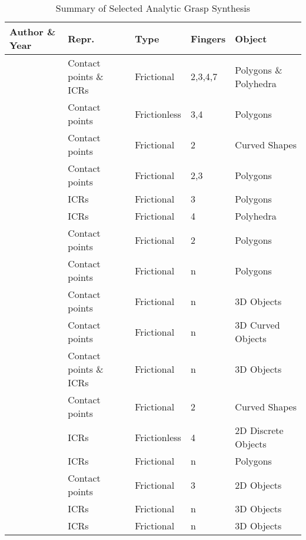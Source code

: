 \documentclass[letterpaper,10pt]{article}
\begin{document}
\begin{table}[t]
\caption{Summary of Selected Analytic Grasp Synthesis}
\label{table:analytic-grasp}
\begin{center}
\begin{tabularx}{1\columnwidth}{m{4cm}m{3.5cm}<{\centering}m{1.8cm}<{\centering}m{1.3cm}<{\centering}m{3.3cm}<{\centering}}
\toprule
 \bf Author \& \bf Year & \bf Repr. & \bf Type & \bf Fingers & \bf Object \\
\midrule
\cite{nguyen1988constructing} & Contact points \& ICRs & Frictional & 2,3,4,7 & Polygons \& Polyhedra \\
\cite{markenscoff1989optimum} & Contact points & Frictionless & 3,4 & Polygons  \\
\cite{faverjon1991computing} & Contact points & Frictional & 2 & Curved Shapes \\
\cite{ferrari1992planning} & Contact points & Frictional & 2,3 & Polygons \\
\cite{ponce1995computing} & ICRs & Frictional & 3 & Polygons  \\
\cite{ponce1997computing} & ICRs & Frictional & 4 & Polyhedra \\
\cite{smith1999computing} & Contact points & Frictional & 2 & Polygons\\
\cite{liu2000computing} & Contact points & Frictional & n & Polygons \\
\cite{ding2001computation} & Contact points & Frictional & n & 3D Objects\\
\cite{zhu2003synthesis} & Contact points & Frictional & n & 3D Curved Objects\\
\cite{pollard2004closure} & Contact points \& ICRs & Frictional & n & 3D Objects \\
\cite{jia2004computation} & Contact points & Frictional & 2 &  Curved Shapes\\
\cite{cornelia2005determining} & ICRs & Frictionless & 4 & 2D Discrete Objects \\
\cite{cornella2005fast} & ICRs & Frictional & n & Polygons\\
\cite{niparnan2006computing} & Contact points & Frictional & 3 & 2D Objects \\
\cite{roa2008independent} & ICRs & Frictional & n & 3D Objects \\
\cite{roa2009computation} & ICRs & Frictional & n & 3D Objects \\

\bottomrule
\end{tabularx}
\end{center}
\vspace{-15pt}
\end{table}
\end{document}
